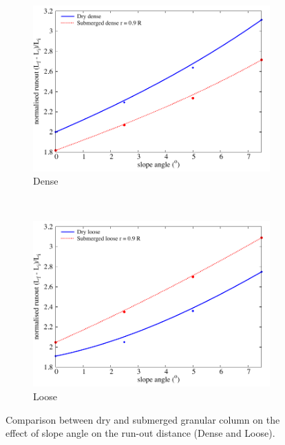 \begin{figure}
	\centering
\begin{subfigure}[b]{0.75\textwidth}
	\centering
    \includegraphics[width=\textwidth]{slope_runout_dense}
    \caption{Dense}
    \label{fig:slope_runout_dense}
\end{subfigure}\\
\begin{subfigure}[b]{0.75\textwidth}
	\centering
    \includegraphics[width=\textwidth]{slope_runout_loose}
    \caption{Loose}
    \label{fig:slope_runout_loose}
\end{subfigure}
\caption{Comparison between dry and submerged granular column on the effect of 
slope angle on the run-out distance (Dense and Loose).}
\label{fig:slope_loose_dense}
\end{figure}


